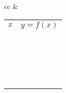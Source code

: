 \begin{tabular}{cc}
   & \begin{tabular}{c|c}
    $x$ & $y=f(x)$\\
    &  \\
    \hline
    &  \\
    \hline
    &  \\
    \hline
    &  \\
    \hline
    &  \\
    \hline
    &  \\
    \hline
    &  \\
    \hline
    &  \\
    \hline
    &  \\
    \hline
    &  \\
    \hline
    &  \\
    \hline
    &  \\
    \hline
    &  \\
    \hline
    &  \\
    \hline
    &  \\
    \hline
    &  \\
    \hline
    &  \\
    \hline
    &  \\
    \hline
    &  \\
    \hline
    
  \end{tabular}\\
\end{tabular}




